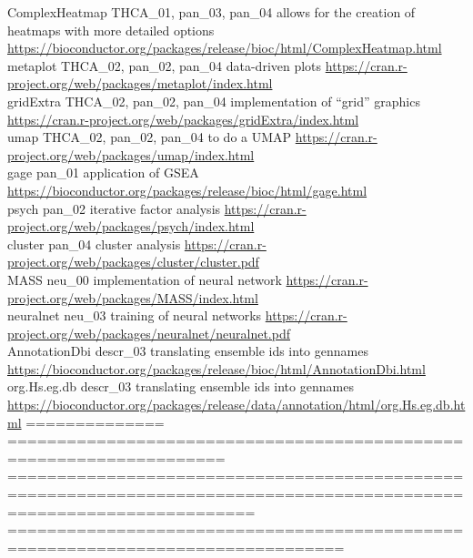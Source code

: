 \documentclass[
]{article}
\begin{document}
ComplexHeatmap THCA\_01, pan\_03, pan\_04 allows for the creation of
heatmaps with more detailed options
\url{https://bioconductor.org/packages/release/bioc/html/ComplexHeatmap.html}\\
metaplot THCA\_02, pan\_02, pan\_04 data-driven plots
\url{https://cran.r-project.org/web/packages/metaplot/index.html}\\
gridExtra THCA\_02, pan\_02, pan\_04 implementation of ``grid'' graphics
\url{https://cran.r-project.org/web/packages/gridExtra/index.html}\\
umap THCA\_02, pan\_02, pan\_04 to do a UMAP
\url{https://cran.r-project.org/web/packages/umap/index.html}\\
gage pan\_01 application of GSEA
\url{https://bioconductor.org/packages/release/bioc/html/gage.html}\\
psych pan\_02 iterative factor analysis
\url{https://cran.r-project.org/web/packages/psych/index.html}\\
cluster pan\_04 cluster analysis
\url{https://cran.r-project.org/web/packages/cluster/cluster.pdf}\\
MASS neu\_00 implementation of neural network
\url{https://cran.r-project.org/web/packages/MASS/index.html}\\
neuralnet neu\_03 training of neural networks
\url{https://cran.r-project.org/web/packages/neuralnet/neuralnet.pdf}\\
AnnotationDbi descr\_03 translating ensemble ids into gennames
\url{https://bioconductor.org/packages/release/bioc/html/AnnotationDbi.html}\\
org.Hs.eg.db descr\_03 translating ensemble ids into gennames
\url{https://bioconductor.org/packages/release/data/annotation/html/org.Hs.eg.db.html}
==============
====================================================================
=====================================================================================================================
================================================================================
\end{document}
